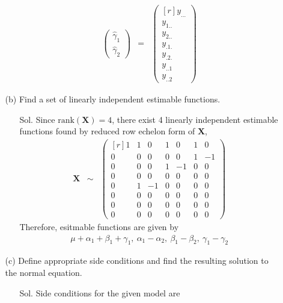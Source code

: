 \documentclass[12pt]{article} %
\begin{document}
\begin{enumerate}
\begin{itemize}
\begin{itemize}
\begin{eqnarray*}
\begin{pmatrix}
			\hat{\gamma}_{1} \\
			\hat{\gamma}_{2}
			\end{pmatrix} &=&
			\begin{pmatrix}[r]
			y_{...} \\
			y_{1..} \\
			y_{2..} \\
			y_{.1.} \\
			y_{.2.} \\
			y_{..1} \\
			y_{..2} 			
			\end{pmatrix}									 					    
		    \end{eqnarray*}
   		  \end{itemize}	    
	   \item[(b)] Find a set of linearly independent estimable functions.
	      \begin{itemize}
		    \item[Sol.] Since $\mathrm{rank}(\mathbf{X})=4$, there exist 4 linearly independent estimable 
		    functions found by reduced row echelon form of $\mathbf{X}$, 
		    \begin{eqnarray*}
		    \mathbf{X}&\sim&
		    \begin{pmatrix}[r]
		    1 &  1 &  0 & 1 &  0 &  1 &  0 \\
		    0 &  0 &  0 & 0 &  0 &  1 & -1 \\
		    0 &  0 &  0 & 1 & -1 &  0 &  0 \\
		    0 &  0 &  0 & 0 &  0 &  0 &  0 \\
		    0 &  1 & -1 & 0 &  0 &  0 &  0 \\
		    0 &  0 &  0 & 0 &  0 &  0 &  0 \\
		    0 &  0 &  0 & 0 &  0 &  0 &  0 \\
		    0 &  0 &  0 & 0 &  0 &  0 &  0 
		    \end{pmatrix}
		    \end{eqnarray*}
		    Therefore, esitmable functions are given by
		    \begin{eqnarray*}
		    \mu+\alpha_{1}+\beta_{1}+\gamma_{1},~\alpha_{1}-\alpha_{2},
		    ~\beta_{1}-\beta_{2},~\gamma_{1}-\gamma_{2}		    
		    \end{eqnarray*}
   		  \end{itemize}	    	   
	   \item[(c)] Define appropriate side conditions and find the resulting solution to the normal equation.	   
	      \begin{itemize}
		    \item[Sol.] Side conditions for the given model are

\end{itemize}
\end{itemize}
\end{enumerate}
\end{document}
